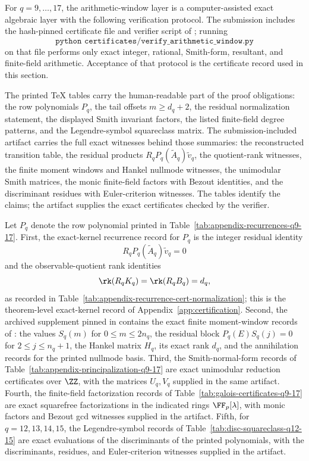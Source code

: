 \begin{theorem}
\label{thm:arithmetic-window-certificates}
For \(q=9,\dots,17\), the arithmetic-window layer is a computer-assisted exact
algebraic layer with the following verification protocol.  The submission
includes the hash-pinned certificate file and verifier script of
; running
\[
  \texttt{python certificates/verify\_arithmetic\_window.py}
\]
on that file performs only exact integer, rational, Smith-form, resultant, and
finite-field arithmetic.  Acceptance of that protocol is the certificate
record used in this section.

The printed TeX tables carry the human-readable part of the proof obligations:
the row polynomials \(P_q\), the tail offsets \(m\ge d_q+2\), the residual
normalization statement, the displayed Smith invariant factors, the listed
finite-field degree patterns, and the Legendre-symbol squareclass matrix.  The
submission-included artifact carries the full exact witnesses behind those
summaries: the reconstructed transition table, the residual products
\(R_qP_q(\widetilde A_q)\widetilde v_q\), the quotient-rank witnesses, the
finite moment windows and Hankel nullmode witnesses, the unimodular Smith
matrices, the monic finite-field factors with Bezout identities, and the
discriminant residues with Euler-criterion witnesses.  The tables identify the
claims; the artifact supplies the exact certificates checked by the verifier.

Let \(P_q\) denote the row polynomial printed in
Table~\ref{tab:appendix-recurrences-q9-17}.  First, the exact-kernel recurrence
record for \(P_q\) is the integer residual identity
\[
  R_qP_q(\widetilde A_q)\widetilde v_q=0
\]
and the observable-quotient rank identities
\[
  \rk(R_qK_q)=\rk(R_qB_q)=d_q,
\]
as recorded in
Table~\ref{tab:appendix-recurrence-cert-normalization}; this is the theorem-level
exact-kernel record of Appendix~\ref{app:certification}.  Second, the archived
supplement pinned in  contains
the exact finite moment-window records of
: the values \(S_q(m)\) for
\(0\le m\le 2n_q\), the residual block \(P_q(E)S_q(j)=0\) for
\(2\le j\le n_q+1\), the Hankel matrix \(H_q\), its exact rank \(d_q\), and
the annihilation records for the printed nullmode basis.  Third, the
Smith-normal-form records of Table~\ref{tab:appendix-principalization-q9-17}
are exact unimodular reduction certificates over \(\ZZ\), with the matrices
\(U_q,V_q\) supplied in the same artifact.  Fourth, the
finite-field factorization records of
Table~\ref{tab:galois-certificates-q9-17} are exact squarefree factorizations
in the indicated rings \(\FF_p[\lambda]\), with monic factors and Bezout gcd
witnesses supplied in the artifact.  Fifth, for
\(q=12,13,14,15\), the Legendre-symbol records of
Table~\ref{tab:disc-squareclass-q12-15} are exact evaluations of the
discriminants of the printed polynomials, with the discriminants, residues, and
Euler-criterion witnesses supplied in the artifact.


\end{theorem}
